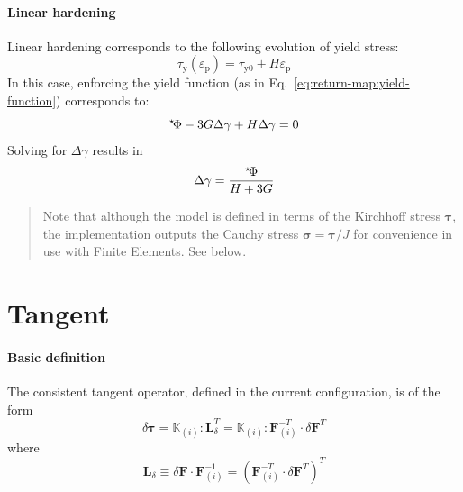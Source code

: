 \documentclass{goose-article}
\newcommand\ST[1]{\hspace*{-.3em}~^\star\!#1}
\newcommand\T[1]{\bm{{#1}}}
\newcommand\TT[1]{\mathbb{{#1}}}
\begin{document}
\paragraph{Linear hardening}

Linear hardening corresponds to the following evolution of yield stress:
\begin{equation}
    \tau_\mathrm{y} ( \varepsilon_\mathrm{p} )
    = \tau_\mathrm{y0} + H \varepsilon_\mathrm{p}
\end{equation}
In this case, enforcing the yield function (as in
Eq.~\eqref{eq:return-map:yield-function}) corresponds to:
\begin{equation}
    \ST{\Phi} - 3 G \Delta \gamma + H \Delta \gamma = 0
\end{equation}
Solving for $\Delta \gamma$ results in
\begin{equation}
    \Delta \gamma = \frac{\ST{\Phi}}{H + 3G}
\end{equation}

\begin{framed}
\begin{quote}
    Note that although the model is defined in terms of the Kirchhoff stress $\T{\tau}$,
    the implementation outputs the Cauchy stress $\T{\sigma} = \T{\tau} / J$
    for convenience in use with Finite Elements.
    See below.
\end{quote}
\end{framed}

\section{Tangent}

\paragraph{Basic definition}

The consistent tangent operator, defined in the current configuration, is of the form
%
\begin{equation}
    \delta \bm{\tau}
    =
    \TT{K}_{(i)}
    : \T{L}_\delta^T
    =
    \TT{K}_{(i)}
    : \T{F}_{(i)}^{-T} \cdot \delta \T{F}^T
    \label{eq:tangent}
\end{equation}
where
\begin{equation}
    \bm{L}_\delta
    \equiv \delta \bm{F} \cdot \bm{F}_{(i)}^{-1}
    = \left( \bm{F}_{(i)}^{-T} \cdot \delta \bm{F}^T \right)^T
\end{equation}
\end{document}
